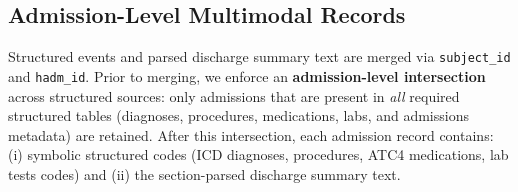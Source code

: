 \subsection{Admission-Level Multimodal Records}
\label{subsec:admission-merge}

Structured events and parsed discharge summary text are merged via \texttt{subject\_id} and \texttt{hadm\_id}. Prior to merging, we enforce an \textbf{admission-level intersection} across structured sources: only admissions that are present in \textit{all} required structured tables (diagnoses, procedures, medications, labs, and admissions metadata) are retained. After this intersection, each admission record contains:
(i) symbolic structured codes (ICD diagnoses, procedures, ATC4 medications, lab tests codes) and
(ii) the section-parsed discharge summary text.




